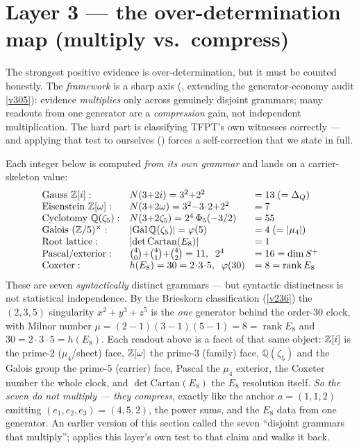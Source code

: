 \section{Layer 3 --- the over-determination map (multiply vs.\ compress)}
The strongest positive evidence is over-determination, but it must be counted honestly. The
\emph{framework} is a sharp axis (, extending the generator-economy
audit \vref{v305}): evidence \emph{multiplies} only across genuinely disjoint grammars; many readouts
from one generator are a \emph{compression} gain, not independent multiplication. The hard part is
classifying TFPT's own witnesses correctly --- and applying that test to ourselves
() forces a self-correction that we state in full.
\begin{keybox}
Each integer below is computed \emph{from its own grammar} and lands on a carrier-skeleton value:
\[
\begin{array}{lll}
\text{Gauss } \Z[i]: & N(3{+}2i)=3^2{+}2^2 & = 13\;(=\Delta_Q)\\
\text{Eisenstein } \Z[\omega]: & N(3{+}2\omega)=3^2{-}3\!\cdot\!2{+}2^2 & = 7\\
\text{Cyclotomy } \mathbb Q(\zeta_5): & N(3{+}2\zeta_5)=2^4\,\Phi_5(-3/2) & = 55\\
\text{Galois } (\Z/5)^\times: & |\!\operatorname{Gal}\mathbb Q(\zeta_5)|=\varphi(5) & = 4\;(=|\mu_4|)\\
\text{Root lattice}: & |\!\det\mathrm{Cartan}(E_8)| & = 1\\
\text{Pascal/exterior}: & \tbinom40{+}\tbinom41{+}\tbinom42 = 11,\;\; 2^4 & = 16=\dim S^+\\
\text{Coxeter}: & h(E_8)=30=2\!\cdot\!3\!\cdot\!5,\;\; \varphi(30) & = 8=\operatorname{rank}E_8
\end{array}
\]
These are seven \emph{syntactically} distinct grammars --- but syntactic distinctness is not statistical
independence. By the Brieskorn classification (\vref{v236}) the $(2,3,5)$ singularity $x^2{+}y^3{+}z^5$ is
the \emph{one} generator behind the order-$30$ clock, with Milnor number $\mu=(2{-}1)(3{-}1)(5{-}1)=8=
\operatorname{rank}E_8$ and $30=2\!\cdot\!3\!\cdot\!5=h(E_8)$. Each readout above is a facet of that same
object: $\mathbb Z[i]$ is the prime-$2$ ($\mu_4$/sheet) face, $\mathbb Z[\omega]$ the prime-$3$ (family) face,
$\mathbb Q(\zeta_5)$ and the Galois group the prime-$5$ (carrier) face, Pascal the $\mu_4$ exterior, the
Coxeter number the whole clock, and $\det\mathrm{Cartan}(E_8)$ the $E_8$ resolution itself. \emph{So the
seven do not multiply --- they compress}, exactly like the anchor $a=(1,1,2)$ emitting
$(e_1,e_2,e_3)=(4,5,2)$, the power sums, and the $E_8$ data from one generator. An earlier version of this
section called the seven ``disjoint grammars that multiply'';  applies
this layer's own test to that claim and walks it back.
\end{keybox}
